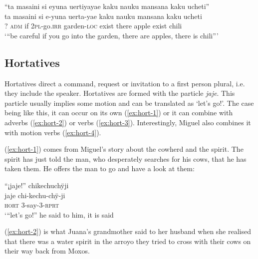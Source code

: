\ea\label{ex:adm-7}
\begingl
\glpreamble “ta masaini si eyuna uertiyayae kaku nauku mansana kaku ucheti”\\
\gla ta masaini si e-yuna uerta-yae kaku nauku mansana kaku ucheti\\
\glb ? \textsc{adm} if 2\textsc{pl}-go.\textsc{irr} garden-\textsc{loc} exist there apple exist chili\\
\glft ‘“be careful if you go into the garden, there are apples, there is chili”’
\endgl
\trailingcitation{[jxx-n101013s-1.371-373]}
\xe



\subsection{Hortatives}\label{sec:Hortatives}

Hortatives direct a command, request or invitation to a first person plural, i.e. they include the speaker. Hortatives are formed with the particle \textit{jaje}. This particle usually implies some motion and can be translated as ‘let’s go!’. The case being like this, it can occur on its own (\ref{ex:hort-1}) or it can combine with adverbs (\ref{ex:hort-2}) or verbs (\ref{ex:hort-3}). Interestingly, Miguel also combines it with motion verbs (\ref{ex:hort-4}). 


(\ref{ex:hort-1}) comes from Miguel’s story about the cowherd and the spirit. The spirit has just told the man, who desperately searches for his cows, that he has taken them. He offers the man to go and have a look at them:

\ea\label{ex:hort-1}
\begingl
\glpreamble “¡jaje!” chikechuchÿji \\
\gla jaje chi-kechu-chÿ-ji\\
\glb \textsc{hort} 3-say-3-\textsc{rprt}\\
\glft ‘“let’s go!” he said to him, it is said
\endgl
\trailingcitation{[mxx-n151017l-1.36]}
\xe

(\ref{ex:hort-2}) is what Juana’s grandmother said to her husband when she realised that there was a water spirit in the arroyo they tried to cross with their cows on their way back from Moxos.


